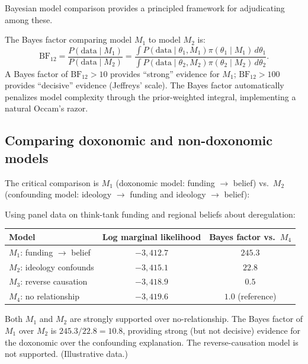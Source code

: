 Bayesian model comparison provides a principled framework for adjudicating among these.

\begin{definition}
\label{def:bayes-factor}
The Bayes factor comparing model $M_1$ to model $M_2$ is:
\[
  \text{BF}_{12} = \frac{P(\text{data} \mid M_1)}{P(\text{data} \mid M_2)} = \frac{\int P(\text{data} \mid \theta_1, M_1) \pi(\theta_1 \mid M_1) \, d\theta_1}{\int P(\text{data} \mid \theta_2, M_2) \pi(\theta_2 \mid M_2) \, d\theta_2}.
\]
A Bayes factor of $\text{BF}_{12} > 10$ provides ``strong'' evidence for $M_1$; $\text{BF}_{12} > 100$ provides ``decisive'' evidence (Jeffreys' scale).
The Bayes factor automatically penalizes model complexity through the prior-weighted integral, implementing a natural Occam's razor.
\end{definition}

\subsection{Comparing doxonomic and non-doxonomic models}

The critical comparison is $M_1$ (doxonomic model: funding $\to$ belief) vs.\ $M_2$ (confounding model: ideology $\to$ funding and ideology $\to$ belief):

\begin{example}
\label{ex:bayes-factor}
Using panel data on think-tank funding and regional beliefs about deregulation:

\begin{center}
\begin{tabular}{lcc}
\toprule
Model & Log marginal likelihood & Bayes factor vs.\ $M_4$ \\
\midrule
$M_1$: funding $\to$ belief & $-3{,}412.7$ & $245.3$ \\
$M_2$: ideology confounds & $-3{,}415.1$ & $22.8$ \\
$M_3$: reverse causation & $-3{,}418.9$ & $0.5$ \\
$M_4$: no relationship & $-3{,}419.6$ & $1.0$ (reference) \\
\bottomrule
\end{tabular}
\end{center}

Both $M_1$ and $M_2$ are strongly supported over no-relationship.
The Bayes factor of $M_1$ over $M_2$ is $245.3 / 22.8 = 10.8$, providing strong (but not decisive) evidence for the doxonomic over the confounding explanation.
The reverse-causation model is not supported.
(Illustrative data.)
\end{example}

